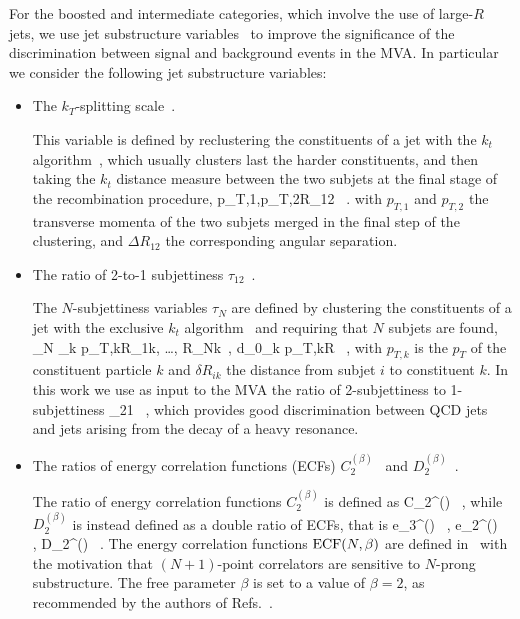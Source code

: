 For the   boosted and intermediate categories,
which involve the use of large-$R$ jets,
we use jet substructure variables~\cite{Salam:2009jx,Aad:2013gja} to
improve the significance of the discrimination between signal and background
events in the MVA.
%
In particular we  consider the following jet
substructure variables:
\begin{itemize}
\item The $k_T$-splitting scale~\cite{Butterworth:2002tt,Butterworth:2008iy}.

  This variable is defined by reclustering the constituents of a jet with the
  $k_t$ algorithm~\cite{Ellis:1993tq},
  which usually clusters last the harder constituents, and then
  taking the $k_t$ distance measure between the two subjets at the final stage of the recombination
  procedure,
  \be
  \label{eq:ktsplitting}
 \lp p_{T,1},p_{T,2}\rp \cdot \Delta R_{12} \, .
\ee
with $p_{T,1}$ and $p_{T,2}$ the transverse momenta of the two subjets merged
in the final step of the clustering, and $\Delta R_{12}$ the corresponding
angular separation.
  
\item The ratio of 2-to-1 subjettiness $\tau_{12}$~\cite{Thaler:2010tr,Thaler:2011gf}.

  The $N$-subjettiness variables $\tau_N$ are defined by clustering the constituents
  of a jet with the exclusive $k_t$ algorithm~\cite{Catani:1993hr}
  and requiring that $N$ subjets are found,
  \be
  \tau_N \equiv {} \sum_k p_{T,k}\lp \delta R_{1k}, \ldots,
  \delta R_{Nk}\rp \, , \qquad d_0\equiv \sum_k p_{T,k}\cdot R \, ,
  \ee
  with $p_{T,k}$ is the $p_T$ of the constituent particle $k$ and $\delta R_{ik}$ the distance from
  subjet $i$ to constituent $k$.
  In this work we use as input to the MVA the ratio of 2-subjettiness to 1-subjettiness
  \be
  \label{eq:tau21}
\tau_{21} \equiv {} \, ,
  \ee
  which provides good discrimination 
  between QCD jets and jets arising from the decay of
  a heavy resonance.
  
\item The ratios of energy correlation functions (ECFs)  $C^{(\beta)}_2$~\cite{Larkoski:2013eya} and
  $D_2^{(\beta)}$~\cite{Larkoski:2014gra}.

  The ratio of energy correlation functions $C_2^{(\beta)}$ is defined as
  \be
  \label{eq:c2}
C_2^{(\beta)} \equiv {} \, ,
\ee
while $D_2^{(\beta)}$ is instead defined as a double ratio of ECFs, that is
\be
e_3^{(\beta)}\equiv {} \, , \quad
  e_2^{(\beta)}\equiv {} \, , \quad
  \label{eq:d2}
D_2^{(\beta)} \equiv {} \, .
\ee
The energy correlation functions ${\rm ECF}(N,\beta)$ are defined
  in~\cite{Larkoski:2013eya} with the motivation that $(N+1)$-point correlators
  are sensitive to $N$-prong substructure.
  The free parameter $\beta$ is set to a value of $\beta=2$,
  as recommended by the authors of Refs.~\cite{Larkoski:2013eya,Larkoski:2014gra}.
\end{itemize}



